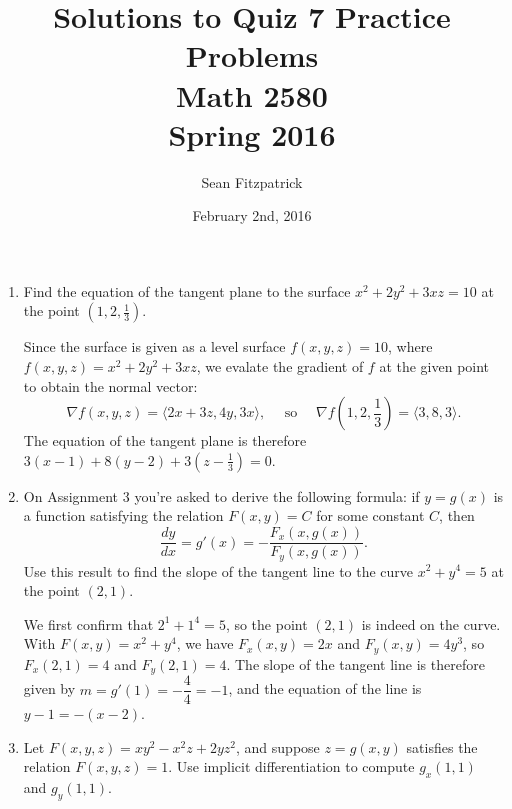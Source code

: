 \documentclass[letterpaper,12pt]{article}
\title{Solutions to Quiz 7 Practice Problems\\Math 2580\\Spring 2016}
\author{Sean Fitzpatrick}
\date{February 2nd, 2016}
\begin{document}
 \maketitle

\begin{enumerate}
 \item Find the equation of the tangent plane to the surface $x^2+2y^2+3xz=10$ at the point $(1,2,\frac{1}{3})$.

\bigskip

Since the surface is given as a level surface $f(x,y,z)=10$, where $f(x,y,z) = x^2+2y^2+3xz$, we evalate the gradient of $f$ at the given point to obtain the normal vector:
\[
 \nabla f(x,y,z) = \langle 2x+3z, 4y, 3x\rangle, \quad \text{ so } \quad \nabla f(1,2,\frac{1}{3}) = \langle 3, 8, 3\rangle.
\]
The equation of the tangent plane is therefore $3(x-1)+8(y-2)+3(z-\frac{1}{3})=0$.

\bigskip

 \item On Assignment 3 you're asked to derive the following formula: if $y=g(x)$ is a function satisfying the relation $F(x,y)=C$ for some constant $C$, then
\[
 \frac{dy}{dx} = g'(x) = -\frac{F_x(x,g(x))}{F_y(x,g(x))}.
\]
Use this result to find the slope of the tangent line to the curve $x^2+y^4=5$ at the point $(2,1)$.

\bigskip

We first confirm that $2^1+1^4=5$, so the point $(2,1)$ is indeed on the curve. With $F(x,y)=x^2+y^4$, we have $F_x(x,y) = 2x$ and $F_y(x,y)=4y^3$, so $F_x(2,1)=4$ and $F_y(2,1)=4$. The slope of the tangent line is therefore given by $m=g'(1) = -\dfrac{4}{4} = -1$, and the equation of the line is $y-1=-(x-2)$.

\bigskip

 \item Let $F(x,y,z) = xy^2-x^2z+2yz^2$, and suppose $z=g(x,y)$ satisfies the relation $F(x,y,z)=1$. Use implicit differentiation to compute $g_x(1,1)$ and $g_y(1,1)$.

\bigskip


\end{enumerate}
\end{document}
